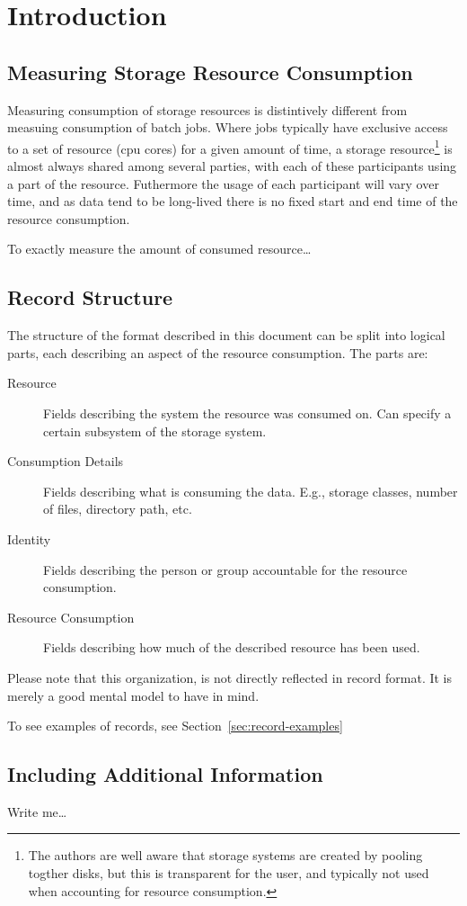 \section{Introduction}


\subsection{Measuring Storage Resource Consumption}

Measuring consumption of storage resources is distintively different from
measuing consumption of batch jobs. Where jobs typically have exclusive access
to a set of resource (cpu cores) for a given amount of time, a storage
resource\footnote{The authors are well aware that storage systems are created
by pooling togther disks, but this is transparent for the user, and typically
not used when accounting for resource consumption.} is almost always shared
among several parties, with each of these participants using a part of the
resource. Futhermore the usage of each participant will vary over time, and as
data tend to be long-lived there is no fixed start and end time of the resource
consumption.

To exactly measure the amount of consumed resource\ldots



\subsection{Record Structure}

The structure of the format described in this document can be split into
logical parts, each describing an aspect of the resource consumption. The parts
are:

\begin{description}

\item[Resource] Fields describing the system the resource was consumed on. Can
specify a certain subsystem of the storage system.

\item[Consumption Details] Fields describing what is consuming the data. E.g.,
storage classes, number of files, directory path, etc.

\item[Identity] Fields describing the person or group accountable for the
resource consumption.

\item[Resource Consumption] Fields describing how much of the described
resource has been used.

\end{description}

Please note that this organization, is not directly reflected in record format.
It is merely a good mental model to have in mind.

To see examples of records, see Section~\ref{sec:record-examples}


\subsection{Including Additional Information}

Write me\ldots

